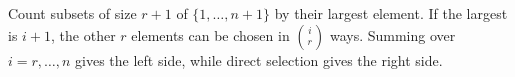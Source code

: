 Count subsets of size $r+1$ of $\{1,\ldots,n+1\}$ by their largest element. If the largest is $i+1$, the other $r$ elements can be chosen in $\binom ir$ ways. Summing over $i=r,\ldots,n$ gives the left side, while direct selection gives the right side.
